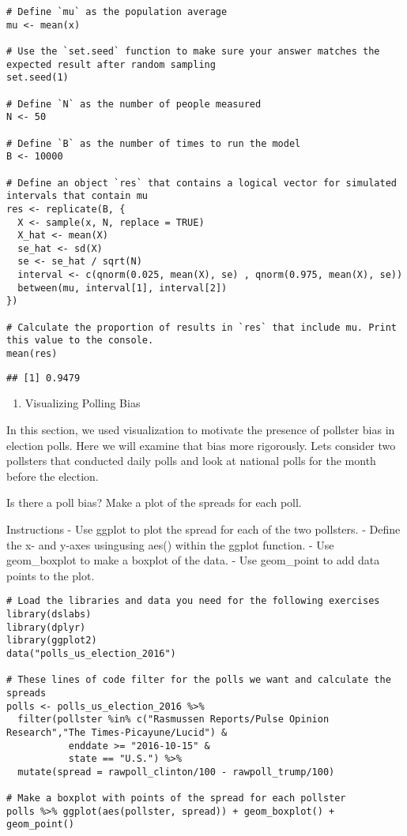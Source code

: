\documentclass[
]{article}
\providecommand{\tightlist}{%
  \setlength{\itemsep}{0pt}\setlength{\parskip}{0pt}}
\begin{document}
\begin{verbatim}
# Define `mu` as the population average
mu <- mean(x)

# Use the `set.seed` function to make sure your answer matches the expected result after random sampling
set.seed(1)

# Define `N` as the number of people measured
N <- 50

# Define `B` as the number of times to run the model
B <- 10000

# Define an object `res` that contains a logical vector for simulated intervals that contain mu
res <- replicate(B, {
  X <- sample(x, N, replace = TRUE)
  X_hat <- mean(X)
  se_hat <- sd(X)
  se <- se_hat / sqrt(N)
  interval <- c(qnorm(0.025, mean(X), se) , qnorm(0.975, mean(X), se))
  between(mu, interval[1], interval[2])
})

# Calculate the proportion of results in `res` that include mu. Print this value to the console.
mean(res)
\end{verbatim}

\begin{verbatim}
## [1] 0.9479
\end{verbatim}

\begin{enumerate}
\def\labelenumi{\arabic{enumi}.}
\setcounter{enumi}{5}
\tightlist
\item
  Visualizing Polling Bias
\end{enumerate}

In this section, we used visualization to motivate the presence of
pollster bias in election polls. Here we will examine that bias more
rigorously. Lets consider two pollsters that conducted daily polls and
look at national polls for the month before the election.

Is there a poll bias? Make a plot of the spreads for each poll.

Instructions - Use ggplot to plot the spread for each of the two
pollsters. - Define the x- and y-axes usingusing aes() within the ggplot
function. - Use geom\_boxplot to make a boxplot of the data. - Use
geom\_point to add data points to the plot.

\begin{verbatim}
# Load the libraries and data you need for the following exercises
library(dslabs)
library(dplyr)
library(ggplot2)
data("polls_us_election_2016")

# These lines of code filter for the polls we want and calculate the spreads
polls <- polls_us_election_2016 %>% 
  filter(pollster %in% c("Rasmussen Reports/Pulse Opinion Research","The Times-Picayune/Lucid") &
           enddate >= "2016-10-15" &
           state == "U.S.") %>% 
  mutate(spread = rawpoll_clinton/100 - rawpoll_trump/100) 

# Make a boxplot with points of the spread for each pollster
polls %>% ggplot(aes(pollster, spread)) + geom_boxplot() + geom_point()
\end{verbatim}
\end{document}
